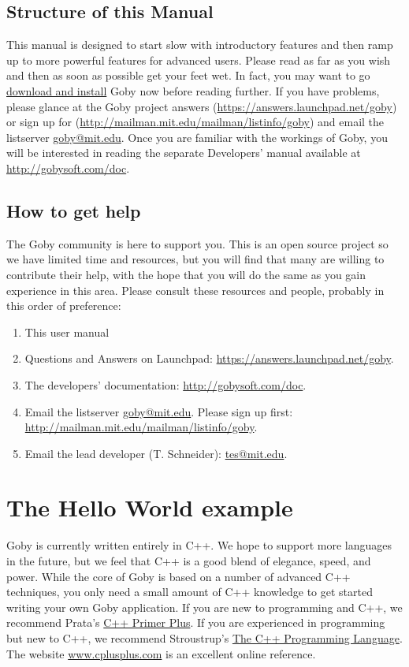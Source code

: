 \documentclass[11pt, letterpaper, oneside]{memoir}
\begin{document}
\section{Structure of this Manual}
This manual is designed to start slow with introductory features and then ramp up to more powerful features for advanced users. Please read as far as you wish and then as soon as possible get your feet wet. In fact, you may want to go \href{http://gobysoft.com/doc}{download and install} Goby now before reading further. If you have problems, please glance at the Goby project answers (\url{https://answers.launchpad.net/goby}) or sign up for (\url{http://mailman.mit.edu/mailman/listinfo/goby}) and email the listserver \href{mailto:goby@mit.edu}{goby@mit.edu}. Once you are familiar with the workings of Goby, you will be interested in reading the separate Developers' manual available at \url{http://gobysoft.com/doc}.

\section{How to get help}
The Goby community is here to support you. This is an open source project so we have limited time and resources, but you will find that many are willing to contribute their help, with the hope that you will do the same as you gain experience in this area. Please consult these resources and people, probably in this order of preference:

\begin{enumerate}
\item This user manual %
\item Questions and Answers on Launchpad: \url{https://answers.launchpad.net/goby}.
\item The developers' documentation: \url{http://gobysoft.com/doc}.
\item Email the listserver \href{mailto:goby@mit.edu}{goby@mit.edu}. Please sign up first: \url{http://mailman.mit.edu/mailman/listinfo/goby}.
\item Email the lead developer (T. Schneider): \href{mailto:tes@mit.edu}{tes@mit.edu}.
\end{enumerate}

\chapter{The Hello World example}

Goby is currently written entirely in C++. We hope to support more languages in the future, but we feel that C++ is a good blend of elegance, speed, and power. While the core of Goby is based on a number of advanced C++ techniques, you only need a small amount of C++ knowledge to get started writing your own Goby application. If you are new to programming and C++, we recommend Prata's \href{http://www.amazon.com/Primer-Plus-5th-Stephen-Prata/dp/0672326973}{C++ Primer Plus}. If you are experienced in programming but new to C++, we recommend Stroustrup's \href{http://www.amazon.com/C-Programming-Language-Special/dp/0201700735}{The C++ Programming Language}. The website \url{www.cplusplus.com} is an excellent online reference.
\end{document}
